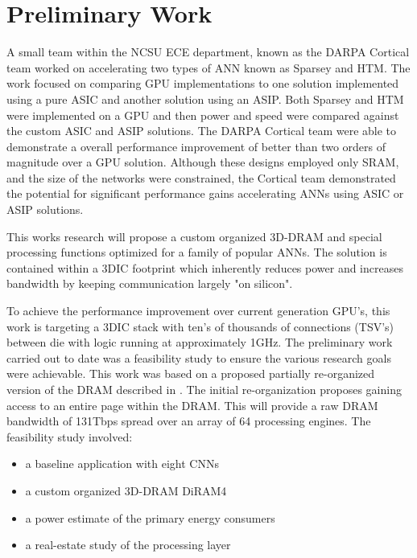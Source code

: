 
\section{Preliminary Work}
\label{chap-five}

A small team within the NCSU ECE department, known as the DARPA Cortical team worked on accelerating two types of ANN known as Sparsey and HTM.
The work\cite{afrl_cortical} focused on comparing GPU implementations to one solution implemented using a pure ASIC and another solution using an ASIP.
Both Sparsey and HTM were implemented on a GPU and then power and speed were compared against the custom ASIC and ASIP solutions.
The DARPA Cortical team were able to demonstrate a overall performance improvement of better than two orders of magnitude over a GPU solution.
Although these designs employed only SRAM, and the size of the networks were constrained, the Cortical team demonstrated the 
potential for significant performance gains accelerating ANNs using ASIC or ASIP solutions.

This works research will propose a custom organized 3D-DRAM and special processing functions optimized for a family of popular ANNs. 
The solution is contained within a 3DIC footprint which inherently reduces power and increases bandwidth by keeping communication largely "on silicon".

To achieve the performance improvement over current generation GPU's, this work is targeting a 3DIC stack with ten's of thousands of
connections (TSV's) between die with logic running at approximately 1GHz.
The preliminary work carried out to date was a feasibility study to ensure the various research goals were achievable.
This work was based on a proposed partially re-organized version of the DRAM described in \cite{tezzaron:diram4}.
The initial re-organization proposes gaining access to an entire page within the DRAM. This will provide a raw DRAM bandwidth of
131Tbps spread over an array of 64 processing engines. 
The feasibility study involved:
\vspace{-2mm}
\begin{itemize}
  \itemsep-0.9mm
  \item a baseline application with eight CNNs \cite{krizhevsky2012imagenetPreso}
  \item a custom organized 3D-DRAM DiRAM4 \cite{tezzaron:diram4} 
  \item a power estimate of the primary energy consumers
  \item a real-estate study of the processing layer
\end{itemize}

